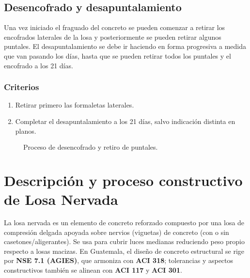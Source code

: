 \documentclass[12pt,a4paper]{article}
\begin{document}
	\subsection{Desencofrado y desapuntalamiento}
	Una vez iniciado el fraguado del concreto se pueden comenzar a retirar los
	encofrados laterales de la losa y posteriormente se pueden retirar algunos
	puntales. El desapuntalamiento se debe ir haciendo en forma progresiva a medida
	que van pasando los días, hasta que se pueden retirar todos los puntales y el
	encofrado a los 21 días.
	
	\subsubsection{Criterios}
	\begin{enumerate}
		\item Retirar primero las formaletas laterales.
		\item Completar el desapuntalamiento a los 21 días, salvo indicación distinta en planos.
	\end{enumerate}
	
	\begin{figure}[h]
		\centering
		\caption{Proceso de desencofrado y retiro de puntales.}
	\end{figure}
	
	
	\section{Descripción y proceso constructivo de Losa Nervada}
	
	La losa nervada es un elemento de concreto reforzado compuesto por una losa de compresión delgada apoyada sobre nervios (viguetas) de concreto (con o sin casetones/aligerantes). Se usa para cubrir luces medianas reduciendo peso propio respecto a losas macizas. En Guatemala, el diseño de concreto estructural se rige por \textbf{NSE 7.1 (AGIES)}, que armoniza con \textbf{ACI 318}; tolerancias y aspectos constructivos también se alinean con \textbf{ACI 117} y \textbf{ACI 301}.
	
\end{document}

